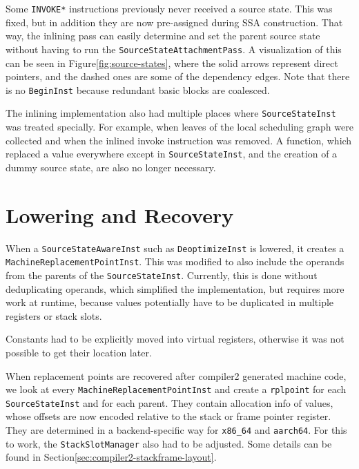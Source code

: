 \documentclass[draft,final]{vutinfth} %
\begin{document}
    Some \lstinline{INVOKE*} instructions previously never received a source state.
    This was fixed,
    but in addition they are now pre-assigned during SSA construction.
    That way, the inlining pass can easily determine and set the parent source state
    without having to run the \lstinline{SourceStateAttachmentPass}.
    A visualization of this can be seen in Figure\ref{fig:source-states},
    where the solid arrows represent direct pointers,
    and the dashed ones are some of the dependency edges.
    Note that there is no \lstinline{BeginInst} because redundant basic blocks are coalesced.


    The inlining implementation also had multiple places where \lstinline{SourceStateInst} was treated specially.
    For example, when leaves of the local scheduling graph were collected
    and when the inlined invoke instruction was removed.
    A function,
    which replaced a value everywhere except in \lstinline{SourceStateInst},
    and the creation of a dummy source state,
    are also no longer necessary.


    \section{Lowering and Recovery}

    When a \lstinline{SourceStateAwareInst} such as \lstinline{DeoptimizeInst} is lowered,
    it creates a \lstinline{MachineReplacementPointInst}.
    This was modified to also include the operands from the parents of the \lstinline{SourceStateInst}.
    Currently, this is done without deduplicating operands,
    which simplified the implementation,
    but requires more work at runtime,
    because values potentially have to be duplicated in multiple registers or stack slots.

    Constants had to be explicitly moved into virtual registers,
    otherwise it was not possible to get their location later.

    When replacement points are recovered
    after compiler2 generated machine code,
    we look at every \lstinline{MachineReplacementPointInst}
    and create a \lstinline{rplpoint} for each \lstinline{SourceStateInst} and for each parent.
    They contain allocation info of values,
    whose offsets are now encoded relative to the stack or frame pointer
    register.
    They are determined in a backend-specific way for \texttt{x86\_64} and \texttt{aarch64}.
    For this to work, the \lstinline{StackSlotManager} also had to be adjusted.
    Some details can be found in Section\ref{sec:compiler2-stackframe-layout}.
\end{document}
